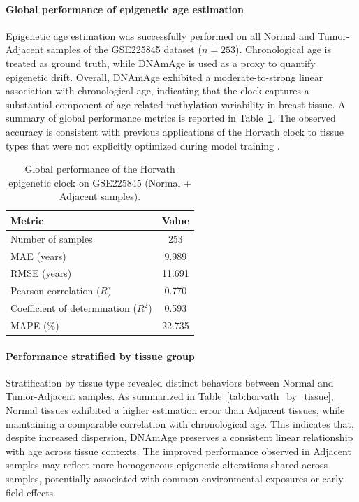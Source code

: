 \documentclass[10pt]{extarticle}
\begin{document}
\paragraph{Global performance of epigenetic age estimation}
Epigenetic age estimation was successfully performed on all Normal and Tumor-Adjacent samples of the GSE225845 dataset ($n = 253$). Chronological age is treated as ground truth, while DNAmAge is used as a proxy to quantify epigenetic drift. Overall, DNAmAge exhibited a moderate-to-strong linear association with chronological age, indicating that the clock captures a substantial component of age-related methylation variability in breast tissue. A summary of global performance metrics is reported in Table~\ref{tab:horvath_global}. The observed accuracy is consistent with previous applications of the Horvath clock to tissue types that were not explicitly optimized during model training \cite{Horvath2013}.

\begin{table}[t]
\centering
\caption{Global performance of the Horvath epigenetic clock on GSE225845 (Normal + Adjacent samples).}
\label{tab:horvath_global}
\begin{tabular}{l c}
\toprule
Metric & Value \\
\midrule
Number of samples & 253 \\
MAE (years) & 9.989 \\
RMSE (years) & 11.691 \\
Pearson correlation ($R$) & 0.770 \\
Coefficient of determination ($R^2$) & 0.593 \\
MAPE (\%) & 22.735 \\
\bottomrule
\end{tabular}
\end{table}

\paragraph{Performance stratified by tissue group}
Stratification by tissue type revealed distinct behaviors between Normal and Tumor-Adjacent samples. As summarized in Table~\ref{tab:horvath_by_tissue}, Normal tissues exhibited a higher estimation error than Adjacent tissues, while maintaining a comparable correlation with chronological age. This indicates that, despite increased dispersion, DNAmAge preserves a consistent linear relationship with age across tissue contexts. The improved performance observed in Adjacent samples may reflect more homogeneous epigenetic alterations shared across samples, potentially associated with common environmental exposures or early field effects.
\end{document}
